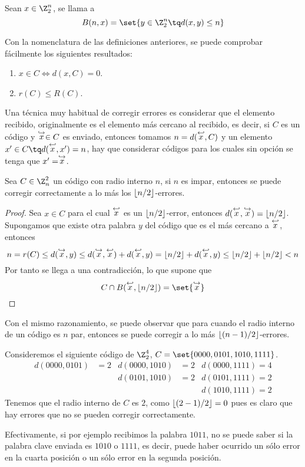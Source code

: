\begin{definition}
	Sean $x\in\Z_2^n$, se llama  a
	\[
		B(n, x) = \set{y\in\Z_2^n \tq d(x,y)\leq n}
	\]
\end{definition}

Con la nomenclatura de las definiciones anteriores, se puede comprobar fácilmente los siguientes resultados:
\begin{enumerate}
	\item $x\in C \iff d(x, C) = 0$.
	\item $r(C)\leq R(C)$.
\end{enumerate}

Una técnica muy habitual de corregir errores es considerar que el elemento recibido, originalmente es el elemento más cercano al recibido, es decir, si $C$ es un código y $\stackrel{\hookrightarrow}{x}\in C$ es enviado, entonces tomamos $n=d(\stackrel{\hookleftarrow}{x}, C)$ y un elemento $x'\in C\tq d(\pull{x}, x')=n$, hay que considerar códigos para los cuales sin opción se tenga que $x'=\stackrel{\hookrightarrow}{x}$.

\begin{lemma}
	Sea $C\in\Z_n^2$ un código con radio interno $n$, si $n$ es impar, entonces se puede corregir correctamente a lo más los $\lfloor n/2 \rfloor$-errores.
\end{lemma}
\begin{proof}
	Sea $x\in C$ para el cual $\stackrel{\hookleftarrow}{x}$ es un $\lfloor n/2 \rfloor$-error, entonces $d(\stackrel{\hookleftarrow}{x}, \stackrel{\hookrightarrow}{x})=\lfloor n/2 \rfloor$.
	Supongamos que existe otra palabra $y$ del código que es el más cercano a $\stackrel{\hookleftarrow}{x}$, entonces
	\[
		n = r(C) \leq d(\stackrel{\hookrightarrow}{x}, y) \leq d(\stackrel{\hookrightarrow}{x}, \stackrel{\hookleftarrow}{x}) + d(\stackrel{\hookleftarrow}{x}, y) = \lfloor n/2 \rfloor + d(\stackrel{\hookleftarrow}{x}, y) \leq \lfloor n/2 \rfloor + \lfloor n/2 \rfloor < n
	\]
	Por tanto se llega a una contradicción, lo que supone que
	\[
		C\cap B(\pull{x}, \ent{n/2}) = \set{\push{x}}\qedhere
	\]
\end{proof}

Con el mismo razonamiento, se puede observar que para cuando el radio interno de un código es $n$ par, entonces se puede corregir a lo más $\lfloor (n-1)/2 \rfloor$-errores.
\begin{example}
	Consideremos el siguiente código de $\Z_2^4$, $C=\set{0000, 0101, 1010, 1111}$.
	\begin{align*}
		d(0000, 0101) &= 2 & d(0000, 1010) &= 2 & d(0000, 1111) = 4 \\
		& & d(0101, 1010) &= 2 & d(0101, 1111) = 2 \\
		& & & & d(1010, 1111) = 2
	\end{align*}
	Tenemos que el radio interno de $C$ es $2$, como $\lfloor (2-1)/2 \rfloor=0$ pues es claro que hay errores que no se pueden corregir correctamente.

	Efectivamente, si por ejemplo recibimos la palabra $1011$, no se puede saber si la palabra clave enviada es $1010$ o $1111$, es decir, puede haber ocurrido un sólo error en la cuarta posición o un sólo error en la segunda posición.
\end{example}

